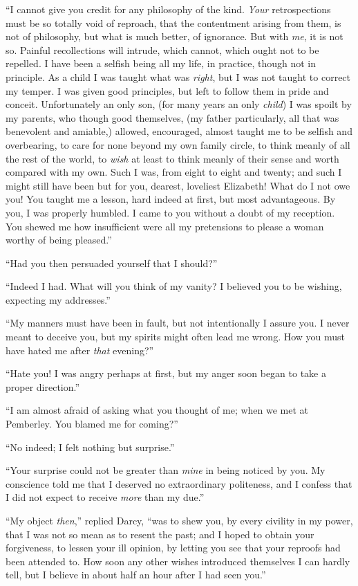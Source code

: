 “I cannot give you credit for any philosophy of the
kind. \textit{Your} retrospections must be so totally void of
reproach, that the contentment arising from them, is not
of philosophy, but what is much better, of ignorance.
But with \textit{me}, it is not so. Painful recollections will intrude,
which cannot, which ought not to be repelled. I have
been a selfish being all my life, in practice, though not in
principle. As a child I was taught what was \textit{right}, but
I was not taught to correct my temper. I was given good
principles, but left to follow them in pride and conceit.
Unfortunately an only son, (for many years an only \textit{child})
I was spoilt by my parents, who though good themselves,
(my father particularly, all that was benevolent and
amiable,) allowed, encouraged, almost taught me to be
selfish and overbearing, to care for none beyond my own
family circle, to think meanly of all the rest of the world,
to \textit{wish} at least to think meanly of their sense and worth
compared with my own. Such I was, from eight to eight
and twenty; and such I might still have been but for
you, dearest, loveliest Elizabeth! What do I not owe you!
You taught me a lesson, hard indeed at first, but most
advantageous. By you, I was properly humbled. I came
to you without a doubt of my reception. You shewed
me how insufficient were all my pretensions to please
a woman worthy of being pleased.”

“Had you then persuaded yourself that I sh\-ould?”

“Indeed I had. What will you think of my vanity?
I believed you to be wishing, expecting my addresses.”

“My manners must have been in fault, but not intentionally
I assure you. I never meant to deceive you, but
my spirits might often lead me wrong. How you must
have hated me after \textit{that} evening?”

“Hate you! I was angry perhaps at first, but my
anger soon began to take a proper direction.”

“I am almost afraid of asking what you thought of me;
when we met at Pemberley. You blamed me for coming?”

“No indeed; I felt nothing but surprise.”

“Your surprise could not be greater than \textit{mine} in being
noticed by you. My conscience told me that I deserved
no extraordinary politeness, and I confess that I did not
expect to receive \textit{more} than my due.”

“My object \textit{then},” replied Darcy, “was to shew you,
by every civility in my power, that I was not so mean as
to resent the past; and I hoped to obtain your forgiveness,
to lessen your ill opinion, by letting you see
that your reproofs had been attended to. How soon
any other wishes introduced themselves I can hardly tell,
but I believe in about half an hour after I had seen you.”

